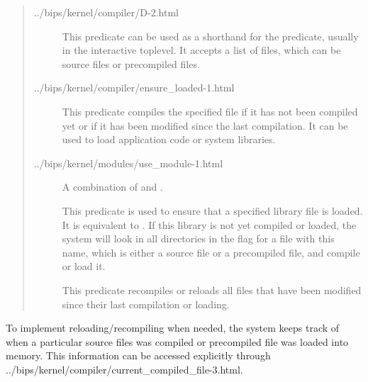 \begin{quote}
\begin{description}
\item[%
{../bips/kernel/compiler/D-2.html}]
This predicate can be used as a shorthand for the  predicate,
usually in the interactive toplevel.
It accepts a list of files, which can be source files or precompiled files.

\item[%
{../bips/kernel/compiler/ensure_loaded-1.html}]
This predicate compiles the specified file if it has not been compiled
yet or if it has been modified since the last compilation.
It can be used to load application code or system libraries.

\item[%
{../bips/kernel/modules/use_module-1.html}]
A combination of  and .

\item[]
This predicate is used to ensure that a specified library file is loaded.
It is equivalent to .
If this library is not yet compiled or loaded, the system will look
in all directories in the  flag for a file with this
name,
which is either a source file or a precompiled file, and compile or load it.

\item[]
This predicate recompiles or reloads all files that have been modified
since their last compilation or loading.
\end{description}
\end{quote}

To implement reloading/recompiling when needed, the system keeps track of
when a particular source files was compiled or precompiled file was loaded
into memory.  This information can be accessed explicitly through
%
{../bips/kernel/compiler/current_compiled_file-3.html}.



